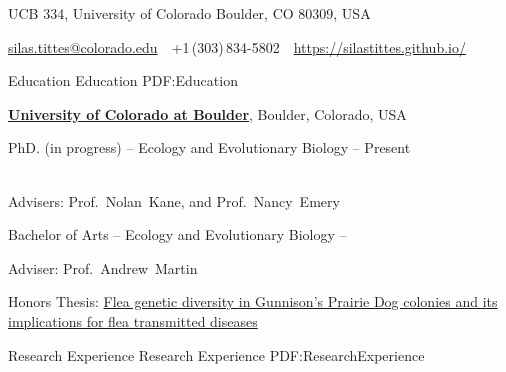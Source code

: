 \documentclass[letterpaper,MMMyyyy,nonstopmode]{simpleresumecv}
\newcommand{\CVAuthor}{Silas Tittes}
\newcommand{\CVWebpage}{https://silastittes.github.io/}
\begin{document}

\Title{\CVAuthor}

\begin{SubTitle}
{UCB 334, University of Colorado Boulder, CO 80309, USA}
\par
\href{mailto:silas.tittes@colorado.edu}
{silas.tittes@colorado.edu}
\,\SubBulletSymbol\,
+1\,(303)\,834-5802
\,\SubBulletSymbol\,
\href{\CVWebpage}
{\url{\CVWebpage}}
\end{SubTitle}

\begin{Body}


\Section
{Education}
{Education}
{PDF:Education}

\Entry
\href{http://www.example.com/my-university}
{\textbf{University of Colorado at Boulder}},
Boulder, Colorado, USA

\Gap
\BulletItem
PhD. (in progress) --
{Ecology and Evolutionary Biology}
\hfill
{} --
Present
\begin{Detail}
\\
Advisers:
Prof.~Nolan~Kane, and
Prof.~Nancy~Emery
\end{Detail}

\Gap
\BulletItem
Bachelor of Arts --
{Ecology and Evolutionary Biology}
\hfill
{} --
\begin{Detail}
Adviser:
Prof.~Andrew~Martin
\end{Detail}
\begin{Detail}
\SubBulletItem
Honors Thesis:
\href{https://scholar.colorado.edu/honr_theses/313/}
{Flea genetic diversity in Gunnison's Prairie Dog colonies and its implications for flea transmitted diseases}
\end{Detail}


\Section
{Research Experience}
{Research Experience}
{PDF:ResearchExperience}


\end{Body}
\end{document}
